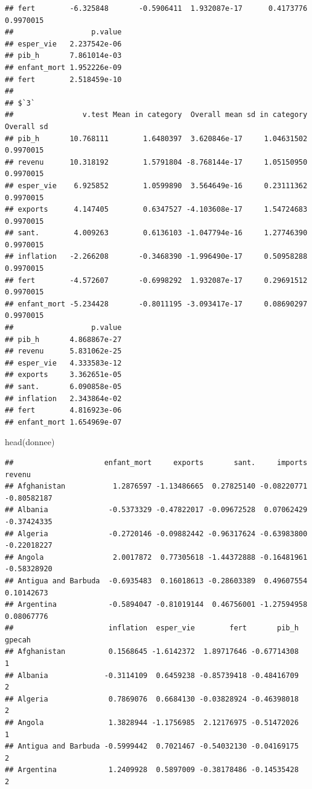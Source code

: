 \documentclass[
]{article}
\newenvironment{Shaded}{}{}
\newcommand{\FunctionTok}[1]{#1}
\newcommand{\NormalTok}[1]{#1}
\begin{document}
\begin{verbatim}
## fert        -6.325848       -0.5906411  1.932087e-17      0.4173776  0.9970015
##                  p.value
## esper_vie   2.237542e-06
## pib_h       7.861014e-03
## enfant_mort 1.952226e-09
## fert        2.518459e-10
## 
## $`3`
##                v.test Mean in category  Overall mean sd in category Overall sd
## pib_h       10.768111        1.6480397  3.620846e-17     1.04631502  0.9970015
## revenu      10.318192        1.5791804 -8.768144e-17     1.05150950  0.9970015
## esper_vie    6.925852        1.0599890  3.564649e-16     0.23111362  0.9970015
## exports      4.147405        0.6347527 -4.103608e-17     1.54724683  0.9970015
## sant.        4.009263        0.6136103 -1.047794e-16     1.27746390  0.9970015
## inflation   -2.266208       -0.3468390 -1.996490e-17     0.50958288  0.9970015
## fert        -4.572607       -0.6998292  1.932087e-17     0.29691512  0.9970015
## enfant_mort -5.234428       -0.8011195 -3.093417e-17     0.08690297  0.9970015
##                  p.value
## pib_h       4.868867e-27
## revenu      5.831062e-25
## esper_vie   4.333583e-12
## exports     3.362651e-05
## sant.       6.090858e-05
## inflation   2.343864e-02
## fert        4.816923e-06
## enfant_mort 1.654969e-07
\end{verbatim}

\begin{Shaded}
\begin{Highlighting}[]
\FunctionTok{head}\NormalTok{(donnee)}
\end{Highlighting}
\end{Shaded}

\begin{verbatim}
##                     enfant_mort     exports       sant.     imports      revenu
## Afghanistan           1.2876597 -1.13486665  0.27825140 -0.08220771 -0.80582187
## Albania              -0.5373329 -0.47822017 -0.09672528  0.07062429 -0.37424335
## Algeria              -0.2720146 -0.09882442 -0.96317624 -0.63983800 -0.22018227
## Angola                2.0017872  0.77305618 -1.44372888 -0.16481961 -0.58328920
## Antigua and Barbuda  -0.6935483  0.16018613 -0.28603389  0.49607554  0.10142673
## Argentina            -0.5894047 -0.81019144  0.46756001 -1.27594958  0.08067776
##                      inflation  esper_vie        fert       pib_h gpecah
## Afghanistan          0.1568645 -1.6142372  1.89717646 -0.67714308      1
## Albania             -0.3114109  0.6459238 -0.85739418 -0.48416709      2
## Algeria              0.7869076  0.6684130 -0.03828924 -0.46398018      2
## Angola               1.3828944 -1.1756985  2.12176975 -0.51472026      1
## Antigua and Barbuda -0.5999442  0.7021467 -0.54032130 -0.04169175      2
## Argentina            1.2409928  0.5897009 -0.38178486 -0.14535428      2
\end{verbatim}
\end{document}
